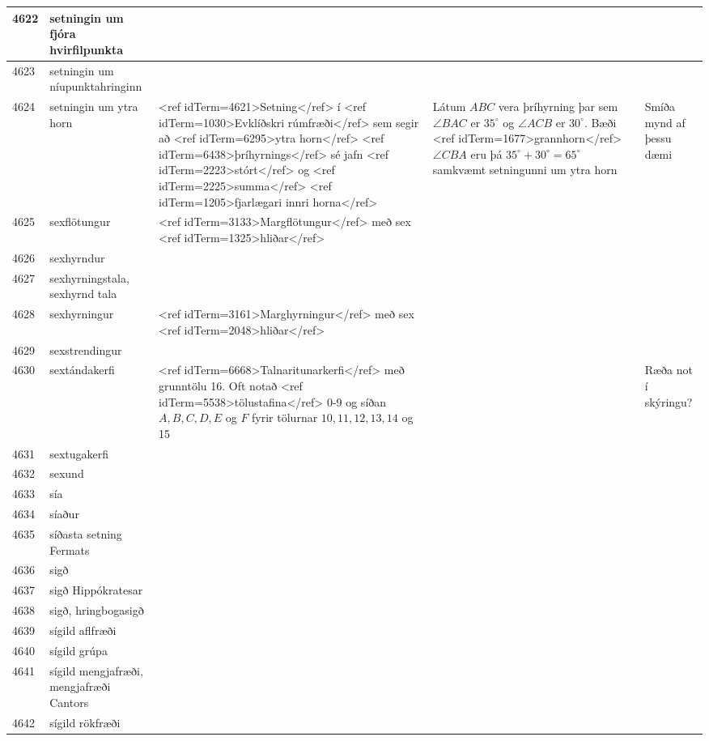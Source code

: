 \begin{longtable}{p{}|p{}|p{}|p{}|p{}}
\hline
4622 & setningin um fjóra hvirfilpunkta &  &  &  \\
\hline
4623 & setningin um níupunktahringinn &  &  &  \\
\hline
4624 & setningin um ytra horn & <ref idTerm=4621>Setning</ref> í <ref idTerm=1030>Evklíðskri rúmfræði</ref> sem segir að <ref idTerm=6295>ytra horn</ref> <ref idTerm=6438>þríhyrnings</ref> sé jafn <ref idTerm=2223>stórt</ref> og <ref idTerm=2225>summa</ref> <ref idTerm=1205>fjarlægari innri horna</ref> & Látum $ABC$ vera þríhyrning þar sem $\angle BAC$ er $35^\circ$ og $\angle ACB$ er $30^\circ$. Bæði <ref idTerm=1677>grannhorn</ref> $\angle CBA$ eru þá $35^\circ + 30^\circ = 65^\circ$ samkvæmt setningunni um ytra horn & Smíða mynd af þessu dæmi \\
\hline
4625 & sexflötungur & <ref idTerm=3133>Margflötungur</ref> með sex <ref idTerm=1325>hliðar</ref> &  &  \\
\hline
4626 & sexhyrndur &  &  &  \\
\hline
4627 & sexhyrningstala, sexhyrnd tala &  &  &  \\
\hline
4628 & sexhyrningur & <ref idTerm=3161>Marghyrningur</ref> með sex <ref idTerm=2048>hliðar</ref> &  & \\
\hline
4629 & sexstrendingur &  &  &  \\
\hline
4630 & sextándakerfi & <ref idTerm=6668>Talnaritunarkerfi</ref> með grunntölu 16. Oft notað <ref idTerm=5538>tölustafina</ref> 0-9 og síðan $A,B,C,D,E$ og $F$ fyrir tölurnar $10,11,12,13,14$ og 15 &  & Ræða not í skýringu? \\
\hline
4631 & sextugakerfi &  &  &  \\
\hline
4632 & sexund &  &  &  \\
\hline
4633 & sía &  &  &  \\
\hline
4634 & síaður &  &  &  \\
\hline
4635 & síðasta setning Fermats &  &  &  \\
\hline
4636 & sigð &  &  &  \\
\hline
4637 & sigð Hippókratesar &  &  &  \\
\hline
4638 & sigð, hringbogasigð &  &  &  \\
\hline
4639 & sígild aflfræði &  &  &  \\
\hline
4640 & sígild grúpa &  &  &  \\
\hline
4641 & sígild mengjafræði, mengjafræði Cantors &  &  &  \\
\hline
4642 & sígild rökfræði &  &  &  \\

\end{longtable}
